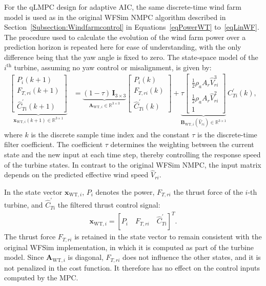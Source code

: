 For the qLMPC design for adaptive AIC, the same discrete-time wind farm model is used as in the original WFSim NMPC algorithm described in Section~\ref{Subsection:Windfarmcontrol} in Equations~\eqref{eqPowerWT} to~\eqref{eqLinWF}. The procedure used to calculate the evolution of the wind farm power over a prediction horizon is repeated here for ease of understanding, with the only difference being that the yaw angle is fixed to zero. The state-space model of the $i^{\text{th}}$ turbine, assuming no yaw control or misalignment, is given by:
\begin{align} \label{eqPowerWTAIC_vector}
    \underbrace{
        \begin{bmatrix}
            P_i(k+1) \\[0.8mm]
            F_{T,ri}(k+1) \\[0.8mm]
            \hat{C}_{Ti}^\prime(k+1)
    \end{bmatrix}}_{\bm{x}_{\text{WT},i}(k+1) \in {\mathbb{R}}^{3\times 1}}
    &=
    \underbrace{(1-\tau)\,\bm{I}_{3\times3}}_{\bm{A}_{\text{WT},i} \in {\mathbb{R}}^{3\times 3}}
    \begin{bmatrix}
        P_i(k) \\[0.8mm]
        F_{T,ri}(k) \\[0.8mm]
        \hat{C}_{Ti}^\prime(k)
    \end{bmatrix}
    +
    \underbrace{\tau
        \begin{bmatrix}
            \tfrac{1}{2}\rho_a A_r \hat{V}_{ri}^3 \\[0.8mm]
            \tfrac{1}{2}\rho_a A_r \hat{V}_{ri}^2 \\[0.8mm]
            1
    \end{bmatrix}}_{\bm{B}_{\text{WT},i}(\hat{V}_{ri}) \in {\mathbb{R}}^{3\times 1}} \, C_{Ti}^\prime(k),
\end{align}
where $k$ is the discrete sample time index and the constant $\tau$ is the discrete-time filter coefficient. The coefficient $\tau$ determines the weighting between the current state and the new input at each time step, thereby controlling the response speed of the turbine states. In contrast to the original WFSim NMPC, the input matrix depends on the predicted effective wind speed $\hat{V}_{ri}$.

In the state vector $\bm{x}_{\text{WT},i}$, $P_i$ denotes the power, $F_{T,ri}$ the thrust force of the $i$-th turbine, and $\hat{C}_{Ti}^\prime$ the filtered thrust control signal:
\begin{align*}
    \bm{x}_{\text{WT},i} = [P_i \quad F_{T,ri} \quad \hat{C}_{Ti}^\prime]^T.
\end{align*}
The thrust force $F_{T,ri}$ is retained in the state vector to remain consistent with the original WFSim implementation, in which it is computed as part of the turbine model. Since $\bm{A}_{\text{WT},i}$ is diagonal, $F_{T,ri}$ does not influence the other states, and it is not penalized in the cost function. It therefore has no effect on the control inputs computed by the MPC.


